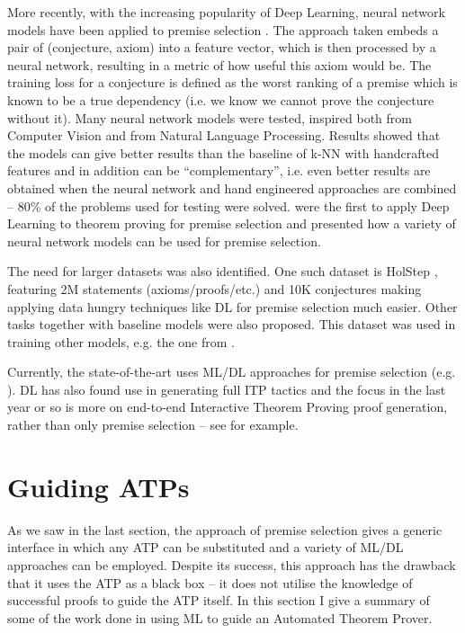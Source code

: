 \documentclass{article}
\begin{document}
More recently, with the increasing popularity of Deep Learning, neural network
models have been applied to premise selection \citep{DeepMath}. The approach
taken embeds a pair of (conjecture, axiom) into a feature vector, which is then
processed by a neural network, resulting in a metric of how useful this axiom
would be. The training loss for a conjecture is defined as the worst ranking of
a premise which is known to be a true dependency (i.e. we know we cannot prove
the conjecture without it). Many neural network models were tested, inspired
both from Computer Vision and from Natural Language Processing. Results showed
that the models can give better results than the baseline of k-NN with
handcrafted features and in addition can be ``complementary'', i.e. even better
results are obtained when the neural network and hand engineered approaches are
combined -- 80\% of the problems used for testing were solved. \cite{DeepMath}
were the first to apply Deep Learning to theorem proving for premise selection
and presented how a variety of neural network models can be used for premise
selection.

The need for larger datasets was also identified. One such dataset is HolStep
\citep{HolStep}, featuring 2M statements (axioms/proofs/etc.) and 10K
conjectures making applying data hungry techniques like DL for premise
selection much easier. Other tasks together with baseline models \citep[\S 3,
4]{HolStep} were also proposed. This dataset was used in training other models,
e.g. the one from \cite{DeepGraph}.


Currently, the state-of-the-art uses ML/DL approaches for premise selection
(e.g. \cite{DeepGraph}). DL has also found use in generating full ITP
tactics and the focus in the last year or so is more on end-to-end Interactive
Theorem Proving proof generation, rather than only premise selection -- see
\cite{LearningToProveITP, GamePad, GNNsForTP} for example.

\section{Guiding ATPs}\label{sec:ATP}

As we saw in the last section, the approach of premise selection gives
a generic interface in which any ATP can be substituted and a variety of ML/DL
approaches can be employed. Despite its success, this approach has the drawback
that it uses the ATP as a black box -- it does not utilise the knowledge of
successful proofs to guide the ATP itself. In this section I give a summary of
some of the work done in using ML to guide an Automated Theorem Prover.
\end{document}
